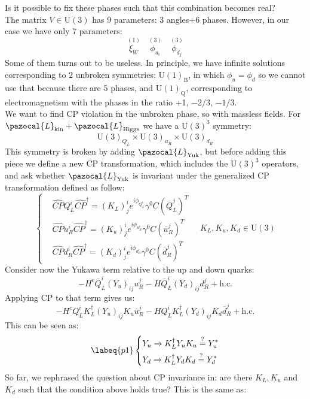 \documentclass[../main.tex]{subfiles}
\begin{document}
Is it possible to fix these phases such that this combination becomes real?\\
The matrix $V\in\text{U}(3)$ has 9 parameters: 3 angles+6 phases. However, in our case we have only 7 parameters: 
\[
\overset{(1)}{\xi_W} \quad \overset{(3)}{\phi_{u_i}} \quad \overset{(3)}{\phi_{d_j}}
\]
Some of them turns out to be useless. In principle, we have infinite solutions corresponding to 2 unbroken symmetries: U$(1)_{\text{B}}$, in which $\phi_u=\phi_d$ so we cannot use that because there are 5 phases, and U$(1)_{\text{Q}}$, corresponding to electromagnetism with the phases in the ratio +1, $-2/3$, $-1/3$.\\
We want to find CP violation in the unbroken phase, so with massless fields. For $\pazocal{L}_{\text{kin}}+\pazocal{L}_{\text{Higgs}}$ we have a U$(3)^3$ symmetry: 
\[
\text{U}(3)_{Q_L}\times\text{U}(3)_{u_R}\times\text{U}(3)_{d_R}
\]
This symmetry is broken by adding $\pazocal{L}_{\text{Yuk}}$, but before adding this piece we define a new CP transformation, which includes the U$(3)^3$ operators, and ask whether $\pazocal{L}_{\text{Yuk}}$ is invariant under the generalized CP transformation defined as follow:
\[
\left\{
\begin{aligned}
&\hat{CP}Q_L^i\hat{CP}^\dagger=(K_L)^i_je^{i\phi_{Q_L^i}}\gamma^0C(\overline{Q}_L^j)^T\\
&\hat{CP}u_R^i\hat{CP}^\dagger=(K_u)^i_je^{i\phi_{u_R^i}}\gamma^0C(\overline{u}_R^j)^T\\
&\hat{CP}d_R^i\hat{CP}^\dagger=(K_d)^i_je^{i\phi_{d_R^i}}\gamma^0C(\overline{d}_R^j)^T
\end{aligned}
\right.
\quad 
K_L,K_u,K_d\in\text{U}(3)
\]
Consider now the Yukawa term relative to the up and down quarks:
\[
-H^c\overline{Q}_L^i(Y_u)_{ij}u_R^j-H\overline{Q}_L^i(Y_d)_{ij}d_R^j+\text{h.c.}
\]
Applying CP to that term gives us:
\[
-H^cQ_L^iK_L^\dagger(Y_u)_{ij}K_u\overline{u}_R^j-HQ_L^iK_L^\dagger(Y_d)_{ij}K_d\overline{d}_R^j+\text{h.c.}
\]
This can be seen as:
\begin{equation}
\labeq{p1}
\left\{
\begin{aligned}
&Y_u\xrightarrow[]{}K_L^\dagger Y_uK_u\stackrel{?}{=}Y_u^*\\
&Y_d\xrightarrow[]{}K_L^\dagger Y_dK_d\stackrel{?}{=}Y_d^*
\end{aligned}
\right.
\end{equation}
So far, we rephrased the question about CP invariance in: are there $K_L,K_u$ and $K_d$ such that the condition above holds true? This is the same as:
\end{document}
